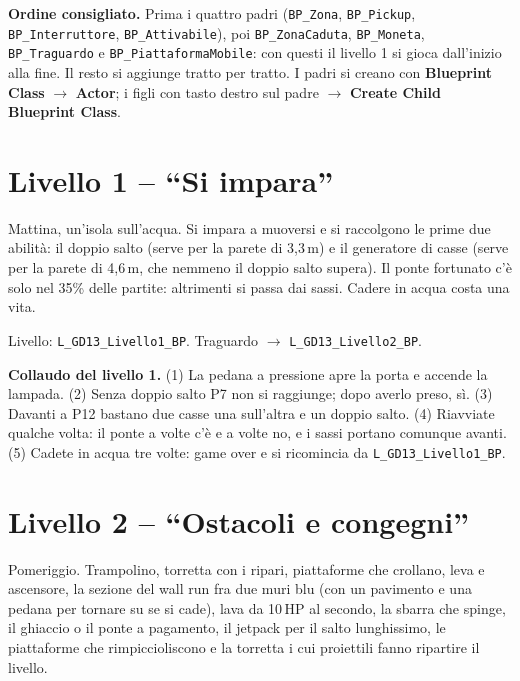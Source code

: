 \documentclass[a4paper,10pt]{article}
\newcommand{\nodo}[1]{\textsf{\textbf{#1}}}
\newcommand{\var}[1]{\texttt{#1}}
\begin{document}


\textbf{Ordine consigliato.} Prima i quattro padri (\var{BP\_Zona}, \var{BP\_Pickup}, \var{BP\_Interruttore}, \var{BP\_Attivabile}), poi \var{BP\_ZonaCaduta}, \var{BP\_Moneta}, \var{BP\_Traguardo} e \var{BP\_PiattaformaMobile}: con questi il livello 1 si gioca dall'inizio alla fine. Il resto si aggiunge tratto per tratto. I padri si creano con \nodo{Blueprint Class} $\rightarrow$ \nodo{Actor}; i figli con tasto destro sul padre $\rightarrow$ \nodo{Create Child Blueprint Class}.



\section{Livello 1 -- ``Si impara''}

Mattina, un'isola sull'acqua. Si impara a muoversi e si raccolgono le prime due abilità: il doppio salto (serve per la parete di 3,3\,m) e il generatore di casse (serve per la parete di 4,6\,m, che nemmeno il doppio salto supera). Il ponte fortunato c'è solo nel 35\% delle partite: altrimenti si passa dai sassi. Cadere in acqua costa una vita.

Livello: \var{L\_GD13\_Livello1\_BP}. Traguardo $\rightarrow$ \var{L\_GD13\_Livello2\_BP}.



\textbf{Collaudo del livello 1.} (1) La pedana a pressione apre la porta e accende la lampada. (2) Senza doppio salto P7 non si raggiunge; dopo averlo preso, sì. (3) Davanti a P12 bastano due casse una sull'altra e un doppio salto. (4) Riavviate qualche volta: il ponte a volte c'è e a volte no, e i sassi portano comunque avanti. (5) Cadete in acqua tre volte: game over e si ricomincia da \var{L\_GD13\_Livello1\_BP}.

\section{Livello 2 -- ``Ostacoli e congegni''}

Pomeriggio. Trampolino, torretta con i ripari, piattaforme che crollano, leva e ascensore, la sezione del wall run fra due muri blu (con un pavimento e una pedana per tornare su se si cade), lava da 10\,HP al secondo, la sbarra che spinge, il ghiaccio o il ponte a pagamento, il jetpack per il salto lunghissimo, le piattaforme che rimpiccioliscono e la torretta i cui proiettili fanno ripartire il livello.
\end{document}
